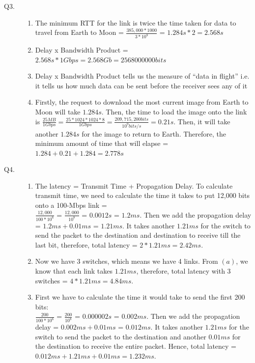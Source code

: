 \documentclass{csc_assignment}
\begin{document}
\begin{description}
\item[Q3.]
	\begin{enumerate}
	\item The minimum RTT for the link is twice the time taken for data to travel from Earth to Moon = 
	$\frac{385,000*1000}{3*10^8}$ = $1.284s * 2 = 2.568s$
	\item Delay x Bandwidth Product = $2.568s * 1Gbps = 2.568Gb = 2568000000 bits$
	\item Delay x Bandwidth Product tells us the measure of ``data in flight'' i.e. it tells us how much data can be sent before the receiver sees any of it
	\item Firstly, the request to download the most current image from Earth to Moon will take $1.284s$. Then, the time to load the image onto the link is 
	$\frac{25MB}{1Gbps} = \frac{25*1024*1024*8}{1Gbps} = \frac{209,715,200bits}{10^{9}bits/s} = 0.21s.$ Then, it will take another $1.284s$ for the image to return to Earth. Therefore, the minimum amount of time that will elapse = $1.284 + 0.21 + 1.284 = 2.778s$
	\end{enumerate}
  

\item[Q4.]
	\begin{enumerate}
	\item The latency = Transmit Time + Propagation Delay. To calculate transmit time, we need to calculate the time it takes to put 12,000 bits onto a 100-Mbps link = \\
	$\frac{12,000}{100*10^{6}}$ = $\frac{12,000}{10^{8}}$ = $0.0012s$ = $1.2ms$. Then we add the propagation delay = $1.2ms + 0.01ms$ = $1.21ms$. It takes another $1.21ms$ for the switch to send the packet to the destination and destination to receive till the last bit, therefore, total latency = $2*1.21ms=2.42ms$.
	\item Now we have 3 switches, which means we have 4 links. From $(a)$, we know that each link takes $1.21ms$, therefore, total latency with 3 switches = $4*1.21ms=4.84ms$.
	\item First we have to calculate the time it would take to send the first 200 bits: \\
	      $\frac{200}{100*10^{6}}$ = $\frac{200}{10^{8}}$ = $0.000002s$ = $0.002ms$. Then we add the propagation delay = $0.002ms + 0.01ms$ = $0.012ms$. It takes another $1.21ms$ for the switch to send the packet to the destination and another $0.01ms$ for the destination to receive the entire packet. Hence, total latency = $0.012ms + 1.21ms + 0.01ms = 1.232ms$.
	\end{enumerate}


\end{description}
\end{document}
